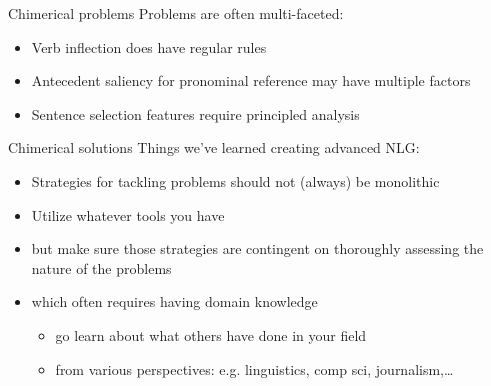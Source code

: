 \documentclass[10pt, compress]{beamer}
\begin{document}
\begin{frame}{Chimerical problems}
	Problems are often multi-faceted:

	\begin{itemize}
		\item Verb inflection does have regular rules
		\item Antecedent saliency for pronominal reference may have multiple factors
		\item Sentence selection features require principled analysis
	\end{itemize}
\end{frame}

\begin{frame}{Chimerical solutions}
	Things we've learned creating advanced NLG:

	\begin{itemize}
		\item Strategies for tackling problems should not (always) be monolithic
		\item Utilize whatever tools you have	\pause
		\item but make sure those strategies are contingent on thoroughly assessing the nature of the problems \pause
		\item which often requires having domain knowledge \pause
		\begin{itemize}
			\item go learn about what others have done in your field \pause
			\item from various perspectives: e.g. linguistics, comp sci, journalism,\ldots
		\end{itemize}
	\end{itemize}
\end{frame}






\end{document}
